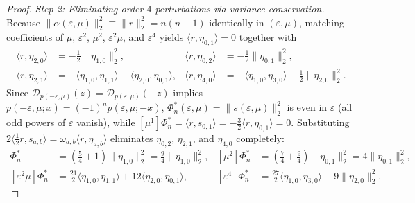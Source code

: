 \documentclass[11pt,a4paper]{article}
\theoremstyle{definition}
\begin{document}
\begin{proof}
\emph{Step 2: Eliminating order-$4$ perturbations via variance conservation.}
Because $\|\alpha(\varepsilon,\mu)\|_2^2 \equiv \|r\|_2^2 = n(n-1)$ identically in $(\varepsilon,\mu)$, matching coefficients of $\mu$, $\varepsilon^2$, $\mu^2$, $\varepsilon^2\mu$, and $\varepsilon^4$ yields $\langle r, \eta_{0,1}\rangle = 0$ together with
\begin{align*}
\langle r, \eta_{2,0}\rangle &= -\frac{1}{2}\|\eta_{1,0}\|_2^2, &
\langle r, \eta_{0,2}\rangle &= -\frac{1}{2}\|\eta_{0,1}\|_2^2, \\
\langle r, \eta_{2,1}\rangle &= -\langle \eta_{1,0}, \eta_{1,1}\rangle - \langle \eta_{2,0}, \eta_{0,1}\rangle, &
\langle r, \eta_{4,0}\rangle &= -\langle \eta_{1,0}, \eta_{3,0}\rangle - \frac{1}{2}\|\eta_{2,0}\|_2^2.
\end{align*}
Since $\mathcal{D}_{p(-\varepsilon,\mu)}(z) = \mathcal{D}_{p(\varepsilon,\mu)}(-z)$ implies $p(-\varepsilon,\mu; x) = (-1)^n p(\varepsilon,\mu; -x)$, $\Phi_n^*(\varepsilon,\mu) = \|s(\varepsilon,\mu)\|_2^2$ is even in $\varepsilon$ (all odd powers of $\varepsilon$ vanish), while $[\mu^1]\Phi_n^* = \langle r, s_{0,1}\rangle = -\frac{3}{2}\langle r, \eta_{0,1}\rangle = 0$. Substituting $2\langle \frac{1}{2}r, s_{a,b}\rangle = \omega_{a,b}\langle r, \eta_{a,b}\rangle$ eliminates $\eta_{0,2}$, $\eta_{2,1}$, and $\eta_{4,0}$ completely:
\begin{align*}
[\varepsilon^2]\Phi_n^* &= \left(\frac{5}{4} + 1\right)\|\eta_{1,0}\|_2^2 = \frac{9}{4}\|\eta_{1,0}\|_2^2, &
[\mu^2]\Phi_n^* &= \left(\frac{7}{4} + \frac{9}{4}\right)\|\eta_{0,1}\|_2^2 = 4\|\eta_{0,1}\|_2^2, \\
[\varepsilon^2\mu]\Phi_n^* &= \frac{21}{2}\langle \eta_{1,0}, \eta_{1,1}\rangle + 12\langle \eta_{2,0}, \eta_{0,1}\rangle, &
[\varepsilon^4]\Phi_n^* &= \frac{27}{2}\langle \eta_{1,0}, \eta_{3,0}\rangle + 9\|\eta_{2,0}\|_2^2.
\end{align*}


\end{proof}
\end{document}
